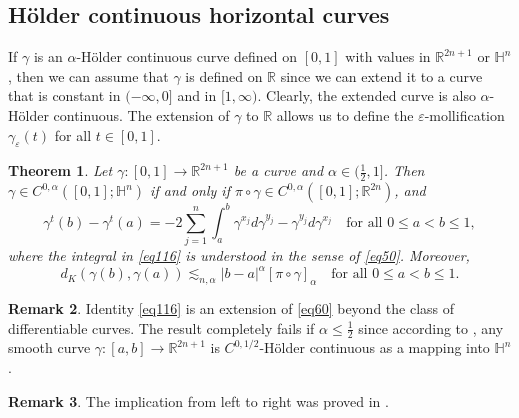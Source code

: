 \documentclass[intlimits,12pt,reqno]{amsart}
\newcommand{\bbbh}{\mathbb H}
\newcommand{\R}{\mathbb R}
\newcommand{\eps}{\varepsilon}
\numberwithin{equation}{section}
\newtheorem{theorem}{Theorem}[section]
\theoremstyle{definition}
\newtheorem{remark}[theorem]{Remark}
\begin{document}
\subsection{H\"older continuous horizontal curves}
\label{HM2}
If $\gamma$ is an $\alpha$-H\"older continuous curve defined on $[0,1]$ with values in $\R^{2n+1}$ or $\bbbh^{n}$, then we can assume that $\gamma$ is defined on $\R$ since we can extend it to a curve that is constant in $(-\infty,0]$ and in $[1,\infty)$. Clearly, the extended curve is also $\alpha$-H\"older continuous. The extension of $\gamma$ to $\R$ allows us to define the $\eps$-mollification $\gamma_\eps(t)$ for all $t\in [0,1]$.
\begin{theorem}
\label{T67}
Let $\gamma:[0,1]\to\R^{2n+1}$ be a curve and $\alpha\in (\frac{1}{2},1]$. Then $\gamma\in C^{0,\alpha}([0,1];\bbbh^n)$ if and only if
$\pi\circ\gamma\in C^{0,\alpha}([0,1];\R^{2n})$, and
\begin{equation}
\label{eq116}
\gamma^t(b)-\gamma^t(a)=-2\sum_{j=1}^n \int_a^b\gamma^{x_j}d\gamma^{y_j}-\gamma^{y_j}d\gamma^{x_j}
\quad
\text{for all } 0\leq a<b\leq 1,
\end{equation}
where the integral in \eqref{eq116} is understood in the sense of \eqref{eq50}. Moreover, 
$$
d_K(\gamma(b),\gamma(a))\lesssim_{n,\alpha}|b-a|^\alpha[\pi\circ\gamma]_\alpha
\quad\text{for all } 0\leq a<b\leq 1.
$$
\end{theorem}
\begin{remark}
Identity \eqref{eq116} is an extension of \eqref{eq60} beyond the class of differentiable curves. The result completely fails if $\alpha\leq\frac{1}{2}$ since according to , any smooth curve $\gamma:[a,b]\to\R^{2n+1}$ is $C^{0,1/2}$-H\"older continuous as a mapping into $\bbbh^n$.
\end{remark}
\begin{remark}
The implication from left to right was proved in \cite[Lemma~3.1]{LZ}.
\end{remark}
\end{document}
